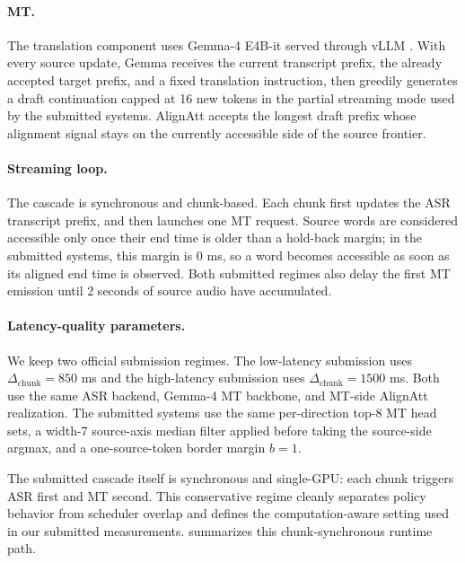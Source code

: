 \documentclass[11pt]{article}
\begin{document}
\paragraph{MT.}
The translation component uses Gemma-4 E4B-it \citep{gemma4card26} served through
vLLM \citep{vllm23}.
With every source update, Gemma receives the current transcript prefix, the already accepted
target prefix, and a fixed translation instruction, then greedily generates a
draft continuation capped at 16 new tokens in the partial streaming mode used
by the submitted systems. AlignAtt accepts the longest draft prefix whose
alignment signal stays on the currently accessible side of the source frontier.

\paragraph{Streaming loop.}
The cascade is synchronous and chunk-based. Each chunk first updates the ASR
transcript prefix, and then launches one MT request. Source words are considered
accessible only once their end time is older than a hold-back margin; in the
submitted systems, this margin is 0 ms, so a word becomes accessible as
soon as its aligned end time is observed. Both submitted regimes also delay the
first MT emission until 2 seconds of source audio have accumulated.

\paragraph{Latency-quality parameters.}
We keep two official submission regimes. The low-latency submission uses
$\Delta_{\mathrm{chunk}}=850$ ms and the high-latency submission uses
$\Delta_{\mathrm{chunk}}=1500$ ms. Both use the same ASR backend, Gemma-4 MT
backbone, and MT-side AlignAtt realization. The submitted systems use
the same per-direction top-8 MT head sets, a width-7 source-axis median filter
applied before taking the source-side argmax, and a one-source-token border
margin $b=1$.



The submitted cascade itself is
synchronous and single-GPU: each chunk triggers ASR first and MT second. This
conservative regime cleanly separates policy behavior from scheduler overlap
and defines the computation-aware setting used in our submitted measurements.
 summarizes this chunk-synchronous runtime path.


\end{document}
